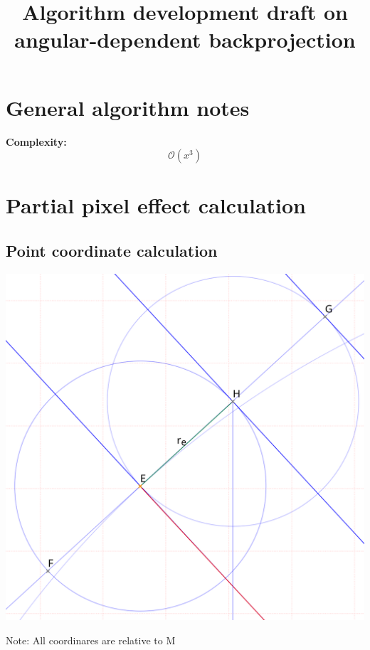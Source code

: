 \documentclass[a4paper,10pt,fleqn]{scrartcl}
\date{}
\title{Algorithm development draft on angular-dependent backprojection}
\numberwithin{equation}{subsection}
\begin{document}
\maketitle\tableofcontents
\section{General algorithm notes}
\textbf{Complexity:}
\begin{equation*}
\mathcal{O}(x^3)
\end{equation*}
\section{Partial pixel effect calculation}
\subsection{Point coordinate calculation}
\begin{minipage}{0.6\textwidth}
\includegraphics[width=\textwidth]{mappicschema}
\end{minipage}
\textrm{Note: All coordinares are relative to M}\\
\end{document}
